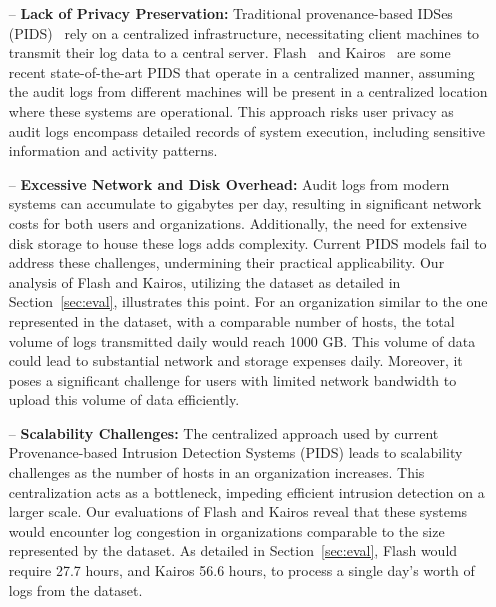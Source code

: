 \begin{itemize} [leftmargin=*]
    \item[--] \textbf{Lack of Privacy Preservation:} Traditional provenance-based IDSes (PIDS)~\cite{flash2024,cheng2023kairos,wang2022threatrace} rely on a centralized infrastructure, necessitating client machines to transmit their log data to a central server. Flash~\cite{flash2024} and Kairos~\cite{cheng2023kairos} are some recent state-of-the-art PIDS that operate in a centralized manner, assuming the audit logs from different machines will be present in a centralized location where these systems are operational. This approach risks user privacy as audit logs encompass detailed records of system execution, including sensitive information and activity patterns.
    
    \item[--] \textbf{Excessive Network and Disk Overhead:} Audit logs from modern systems can accumulate to gigabytes per day, resulting in significant network costs for both users and organizations. Additionally, the need for extensive disk storage to house these logs adds complexity. Current PIDS models fail to address these challenges, undermining their practical applicability. Our analysis of Flash and Kairos, utilizing the \optc dataset as detailed in Section~\ref{sec:eval}, illustrates this point. For an organization similar to the one represented in the \optc dataset, with a comparable number of hosts, the total volume of logs transmitted daily would reach 1000 GB. This volume of data could lead to substantial network and storage expenses daily. Moreover, it poses a significant challenge for users with limited network bandwidth to upload this volume of data efficiently.
    
    \item[--] \textbf{Scalability Challenges:} The centralized approach used by current Provenance-based Intrusion Detection Systems (PIDS) leads to scalability challenges as the number of hosts in an organization increases. This centralization acts as a bottleneck, impeding efficient intrusion detection on a larger scale. Our evaluations of Flash and Kairos reveal that these systems would encounter log congestion in organizations comparable to the size represented by the \optc dataset. As detailed in Section~\ref{sec:eval}, Flash would require 27.7 hours, and Kairos 56.6 hours, to process a single day's worth of logs from the \optc dataset. %
\end{itemize}

